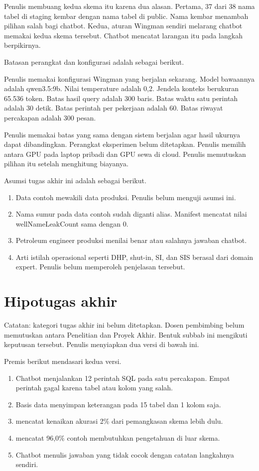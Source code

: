 Penulis membuang kedua skema itu karena dua alasan. Pertama, 37 dari 38 nama tabel di staging kembar dengan nama tabel di public. Nama kembar menambah pilihan salah bagi chatbot. Kedua, aturan Wingman sendiri melarang chatbot memakai kedua skema tersebut. Chatbot mencatat larangan itu pada langkah berpikirnya.

Batasan perangkat dan konfigurasi adalah sebagai berikut.

Penulis memakai konfigurasi Wingman yang berjalan sekarang. Model bawaannya adalah qwen3.5:9b. Nilai temperature adalah 0,2. Jendela konteks berukuran 65.536 token. Batas hasil query adalah 300 baris. Batas waktu satu perintah adalah 30 detik. Batas perintah per pekerjaan adalah 60. Batas riwayat percakapan adalah 300 pesan.

Penulis memakai batas yang sama dengan sistem berjalan agar hasil ukurnya dapat dibandingkan. Perangkat eksperimen belum ditetapkan. Penulis memilih antara GPU pada laptop pribadi dan GPU sewa di cloud. Penulis memutuskan pilihan itu setelah menghitung biayanya.

Asumsi tugas akhir ini adalah sebagai berikut.
\begin{enumerate}
\item	Data contoh mewakili data produksi. Penulis belum menguji asumsi ini.
\item	Nama sumur pada data contoh sudah diganti alias. Manifest mencatat nilai wellNameLeakCount sama dengan 0.
\item	Petroleum engineer produksi menilai benar atau salahnya jawaban chatbot.
\item	Arti istilah operasional seperti DHP, shut-in, SI, dan SIS berasal dari domain expert. Penulis belum memperoleh penjelasan tersebut.
\end{enumerate}

\section{Hipotugas akhir}
Catatan: kategori tugas akhir ini belum ditetapkan. Dosen pembimbing belum memutuskan antara Penelitian dan Proyek Akhir. Bentuk subbab ini mengikuti keputusan tersebut. Penulis menyiapkan dua versi di bawah ini.

Premis berikut mendasari kedua versi.
\begin{enumerate}
\item	Chatbot menjalankan 12 perintah SQL pada satu percakapan. Empat perintah gagal karena tabel atau kolom yang salah.
\item	Basis data menyimpan keterangan pada 15 tabel dan 1 kolom saja.
\item	\textcite{talaei2024chesscontextualharnessingefficient} mencatat kenaikan akurasi 2\% dari pemangkasan skema lebih dulu.
\item	\textcite{liao2026entsqlbenchmarkgroundingtexttosql} mencatat 96,0\% contoh membutuhkan pengetahuan di luar skema.
\item	Chatbot menulis jawaban yang tidak cocok dengan catatan langkahnya sendiri.
\end{enumerate}

